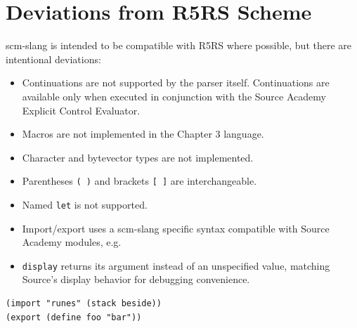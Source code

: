 \section*{Deviations from R5RS Scheme}

scm-slang is intended to be compatible with R5RS where possible, but there are
intentional deviations:

\begin{itemize}
\item Continuations are not supported by the parser itself. Continuations are
  available only when executed in conjunction with the Source Academy Explicit
  Control Evaluator.
\item Macros are not implemented in the Chapter 3 language.
\item Character and bytevector types are not implemented.
\item Parentheses \texttt{( )} and brackets \texttt{[ ]} are interchangeable.
\item Named \texttt{let} is not supported.
\item Import/export uses a scm-slang specific syntax compatible with Source
  Academy modules, e.g.
\item \texttt{display} returns its argument instead of an unspecified value,
  matching Source's display behavior for debugging convenience.
\end{itemize}

\begin{lstlisting}
(import "runes" (stack beside))
(export (define foo "bar"))
\end{lstlisting}
